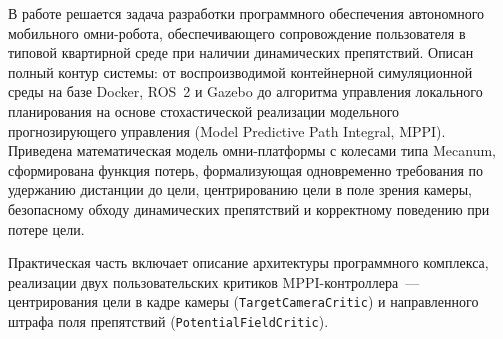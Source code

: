 

\noindent
В работе решается задача разработки программного обеспечения автономного
мобильного омни-робота, обеспечивающего сопровождение пользователя в типовой
квартирной среде при наличии динамических препятствий. Описан полный контур
системы: от воспроизводимой контейнерной симуляционной среды на базе
Docker, ROS~2 и Gazebo до алгоритма управления локального планирования на
основе стохастической реализации модельного прогнозирующего управления
(Model Predictive Path Integral, MPPI). Приведена математическая модель
омни-платформы с колесами типа Mecanum, сформирована функция потерь,
формализующая одновременно требования по удержанию дистанции до цели,
центрированию цели в поле зрения камеры, безопасному обходу динамических
препятствий и корректному поведению при потере цели. 

Практическая часть включает описание архитектуры программного
комплекса, реализации двух пользовательских критиков
MPPI-контроллера~--- центрирования цели в кадре камеры
(\texttt{TargetCameraCritic}) и направленного штрафа поля препятствий
(\texttt{PotentialFieldCritic}).